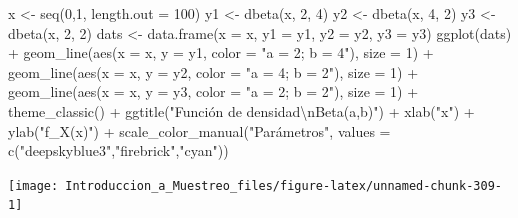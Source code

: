 \documentclass[
]{book}
\newenvironment{Shaded}{\begin{snugshade}}{\end{snugshade}}
\newcommand{\AttributeTok}[1]{\textcolor[rgb]{0.77,0.63,0.00}{#1}}
\newcommand{\DecValTok}[1]{\textcolor[rgb]{0.00,0.00,0.81}{#1}}
\newcommand{\FunctionTok}[1]{\textcolor[rgb]{0.00,0.00,0.00}{#1}}
\newcommand{\NormalTok}[1]{#1}
\newcommand{\OtherTok}[1]{\textcolor[rgb]{0.56,0.35,0.01}{#1}}
\newcommand{\SpecialCharTok}[1]{\textcolor[rgb]{0.00,0.00,0.00}{#1}}
\newcommand{\StringTok}[1]{\textcolor[rgb]{0.31,0.60,0.02}{#1}}
\begin{document}
\begin{Shaded}
\begin{Highlighting}[]
\NormalTok{x  }\OtherTok{\textless{}{-}} \FunctionTok{seq}\NormalTok{(}\DecValTok{0}\NormalTok{,}\DecValTok{1}\NormalTok{, }\AttributeTok{length.out =} \DecValTok{100}\NormalTok{)}
\NormalTok{y1 }\OtherTok{\textless{}{-}} \FunctionTok{dbeta}\NormalTok{(x, }\DecValTok{2}\NormalTok{, }\DecValTok{4}\NormalTok{)}
\NormalTok{y2 }\OtherTok{\textless{}{-}} \FunctionTok{dbeta}\NormalTok{(x, }\DecValTok{4}\NormalTok{, }\DecValTok{2}\NormalTok{)}
\NormalTok{y3 }\OtherTok{\textless{}{-}} \FunctionTok{dbeta}\NormalTok{(x, }\DecValTok{2}\NormalTok{, }\DecValTok{2}\NormalTok{)}
\NormalTok{dats }\OtherTok{\textless{}{-}} \FunctionTok{data.frame}\NormalTok{(}\AttributeTok{x =}\NormalTok{ x, }\AttributeTok{y1 =}\NormalTok{ y1, }\AttributeTok{y2 =}\NormalTok{ y2, }\AttributeTok{y3 =}\NormalTok{ y3)}
\FunctionTok{ggplot}\NormalTok{(dats) }\SpecialCharTok{+} 
  \FunctionTok{geom\_line}\NormalTok{(}\FunctionTok{aes}\NormalTok{(}\AttributeTok{x =}\NormalTok{ x, }\AttributeTok{y =}\NormalTok{ y1, }\AttributeTok{color =} \StringTok{"a = 2; b = 4"}\NormalTok{), }\AttributeTok{size =} \DecValTok{1}\NormalTok{) }\SpecialCharTok{+} 
  \FunctionTok{geom\_line}\NormalTok{(}\FunctionTok{aes}\NormalTok{(}\AttributeTok{x =}\NormalTok{ x, }\AttributeTok{y =}\NormalTok{ y2, }\AttributeTok{color =} \StringTok{"a = 4; b = 2"}\NormalTok{), }\AttributeTok{size =} \DecValTok{1}\NormalTok{) }\SpecialCharTok{+} 
  \FunctionTok{geom\_line}\NormalTok{(}\FunctionTok{aes}\NormalTok{(}\AttributeTok{x =}\NormalTok{ x, }\AttributeTok{y =}\NormalTok{ y3, }\AttributeTok{color =} \StringTok{"a = 2; b = 2"}\NormalTok{), }\AttributeTok{size =} \DecValTok{1}\NormalTok{) }\SpecialCharTok{+} 
  \FunctionTok{theme\_classic}\NormalTok{() }\SpecialCharTok{+} \FunctionTok{ggtitle}\NormalTok{(}\StringTok{"Función de densidad}\SpecialCharTok{\textbackslash{}n}\StringTok{Beta(a,b)"}\NormalTok{) }\SpecialCharTok{+}
  \FunctionTok{xlab}\NormalTok{(}\StringTok{"x"}\NormalTok{) }\SpecialCharTok{+} \FunctionTok{ylab}\NormalTok{(}\StringTok{"f\_X(x)"}\NormalTok{) }\SpecialCharTok{+} 
  \FunctionTok{scale\_color\_manual}\NormalTok{(}\StringTok{"Parámetros"}\NormalTok{, }\AttributeTok{values =} \FunctionTok{c}\NormalTok{(}\StringTok{"deepskyblue3"}\NormalTok{,}\StringTok{"firebrick"}\NormalTok{,}\StringTok{"cyan"}\NormalTok{))}
\end{Highlighting}
\end{Shaded}

\begin{center}\texttt{[image: Introduccion\_a\_Muestreo\_files/figure-latex/unnamed-chunk-309-1]} \end{center}
\end{document}
